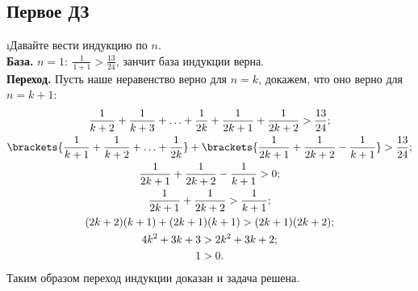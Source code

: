 \subsection{Первое ДЗ}

\i Давайте вести индукцию по $n$.\\
\textbf{База.} $n=1: \ \frac{1}{1+1} > \frac{13}{24}$, занчит база индукции верна.\\
\textbf{Переход.} Пусть наше неравенство верно для $n = k$, докажем, что оно верно для $n = k + 1$:
\begin{gather*}
    \frac{1}{k+2} + \frac{1}{k+3} + \ldots + \frac{1}{2k} + \frac{1}{2k+1} + \frac{1}{2k+2} > \frac{13}{24};\\
    \brackets{\frac{1}{k+1} + \frac{1}{k+2} + \ldots + \frac{1}{2k}} + \brackets{\frac{1}{2k+1} + \frac{1}{2k+2} - \frac{1}{k+1}} > \frac{13}{24};\\
    \frac{1}{2k+1} + \frac{1}{2k+2} - \frac{1}{k+1} > 0;\\
    \frac{1}{2k+1} + \frac{1}{2k+2} > \frac{1}{k+1};\\
    (2k+2)(k+1) + (2k+1)(k+1) > (2k+1)(2k+2);\\
    4k^2 + 3k + 3 > 2k^2 + 3k + 2;\\
    1 > 0.
\end{gather*}
Таким образом переход индукции доказан и задача решена.

